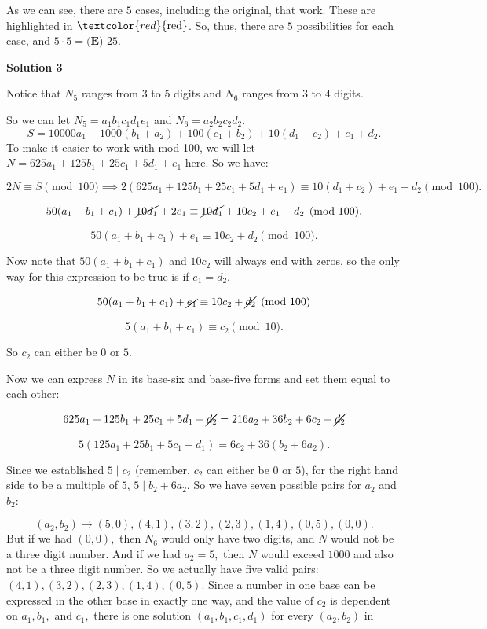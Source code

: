 \begin{enumerate}
 As we can see, there are $5$ cases, including the original, that work. These are highlighted in $\textcolor{red}{\text{red}}$. So, thus, there are $5$ possibilities for each case, and $5\cdot 5=\boxed{\textbf{(E) }25}$.

 



\textbf{Solution 3}

Notice that $N_5$ ranges from $3$ to $5$ digits and $N_6$ ranges from $3$ to $4$ digits.

 So we can let $N_5 = a_1b_1c_1d_1e_1$ and $N_6 = a_2b_2c_2d_2$. 
 \[S = 10000a_1 + 1000(b_1 + a_2) + 100(c_1 + b_2) + 10(d_1 + c_2) + e_1 + d_2.\] To make it easier to work with mod 100, we will let $N = 625a_1 + 125b_1 + 25c_1 + 5d_1 + e_1$ here. So we have:

 
 \[2N \equiv S \pmod{100} \implies 2(625a_1 + 125b_1 + 25c_1 + 5d_1 + e_1) \equiv 10(d_1 + c_2) + e_1 + d_2 \pmod{100}.\]

 \[50(a_1 + b_1 + c_1) + \cancel{10d_1} + 2e_1 \equiv \cancel{10d_1} + 10c_2 + e_1 + d_2 \pmod{100}.\]

 \[50(a_1 + b_1 + c_1) + e_1 \equiv 10c_2 + d_2 \pmod{100}.\] 

 Now note that $50(a_1 + b_1 + c_1)$ and $10c_2$ will always end with zeros, so the only way for this expression to be true is if $e_1 = d_2.$

 \[50(a_1 + b_1 + c_1) + \cancel{e_1} \equiv 10c_2 + \cancel{d_2} \pmod{100}\]

 \[5(a_1 + b_1 + c_1) \equiv c_2 \pmod{10}.\] 

 So $c_2$ can either be $0$ or $5$.

 Now we can express $N$ in its base-six and base-five forms and set them equal to each other: 

 
 \[625a_1 + 125b_1 + 25c_1 + 5d_1 + \cancel{d_2} = 216a_2 + 36b_2 + 6c_2 + \cancel{d_2}\]

 \[5(125a_1 + 25b_1 + 5c_1 + d_1) = 6c_2 + 36(b_2 + 6a_2).\] 

 Since we established $5 \mid c_2$ (remember, $c_2$ can either be $0$ or $5$), for the right hand side to be a multiple of $5$, $5 \mid b_2 + 6a_2.$ So we have seven possible pairs for $a_2$ and $b_2$: 

 
 \[(a_2, b_2) \rightarrow (5,0), (4,1), (3,2), (2,3), (1,4), (0, 5), (0,0).\] But if we had $(0,0),$ then $N_6$ would only have two digits, and $N$ would not be a three digit number. And if we had $a_2 = 5,$ then $N$ would exceed $1000$ and also not be a three digit number. So we actually have five valid pairs: $(4,1), (3,2), (2,3), (1,4), (0, 5).$ Since a number in one base can be expressed in the other base in exactly one way, and the value of $c_2$ is dependent on $a_1, b_1,$ and $c_1,$ there is one solution $(a_1, b_1, c_1, d_1)$ for every $(a_2, b_2)$ in 


\end{enumerate}
